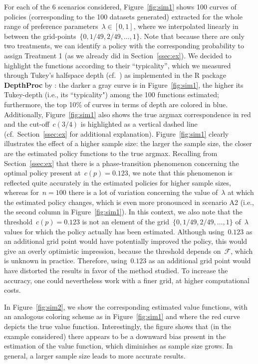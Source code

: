 \documentclass[11pt, a4paper]{article}
\theoremstyle{definition}
\begin{document}
For each of the 6 scenarios considered, Figure~\ref{fig:sim1} shows 100 curves of policies (corresponding to the 100 datasets generated) extracted for the whole range of preference parameters~$\lambda \in [0, 1]$, where we interpolated linearly in between the grid-points~$\{0, 1/49, 2/49, \hdots, 1\}$. Note that because there are only two treatments, we can identify a policy with the corresponding probability to assign Treatment 1 (as we already did in Section~\ref{ssec:ex}). We decided to highlight the functions according to their ``typicality'', which we measured through Tukey's halfspace depth (cf.~\cite{tukdepth}) as implemented in the R package \textbf{DepthProc} by \cite{depthproc}: the darker a gray curve is in Figure~\ref{fig:sim1}, the higher its Tukey-depth (i.e., its ``typicality") among the 100 functions estimated; furthermore, the top 10\% of curves in terms of depth are colored in blue. Additionally, Figure~\ref{fig:sim1} also shows the true argmax correspondence in red and the cut-off~$c(3/4)$ is highlighted as a vertical dashed line (cf.~Section~\ref{ssec:ex} for additional explanation). Figure~\ref{fig:sim1} clearly illustrates the effect of a higher sample size: the larger the sample size, the closer are the estimated policy functions to the true argmax. Recalling from Section~\ref{ssec:ex} that there is a phase-transition phenomenon concerning the optimal policy present at~$c(p) = 0.123$, we note that this phenomenon is reflected quite accurately in the estimated policies for higher sample sizes, whereas for~$n = 100$ there is a lot of variation concerning the value of~$\lambda$ at which the estimated policy changes, which is even more pronounced in scenario A2 (i.e., the second column in Figure~\ref{fig:sim1}). In this context, we also note that the threshold~$c(p) =0.123$ is not an element of the grid~$\{0, 1/49, 2/49, \hdots, 1\}$ of~$\lambda$ values for which the policy actually has been estimated. Although using~$0.123$ as an additional grid point would have potentially improved the policy, this would give an overly optimistic impression, because the threshold depends on~$\mathcal{F}$, which is unknown in practice. Therefore, using~$0.123$ as an additional grid point would have distorted the results in favor of the method studied. To increase the accuracy, one could nevertheless work with a finer grid, at higher computational costs.

In Figure~\ref{fig:sim2}, we show the corresponding estimated value functions, with an analogous coloring scheme as in Figure~\ref{fig:sim1} and where the red curve depicts the true value function. Interestingly, the figure shows that (in the example considered) there appears to be a downward bias present in the estimation of the value function, which diminishes as sample size grows. In general, a larger sample size leads to more accurate results. 
\end{document}
